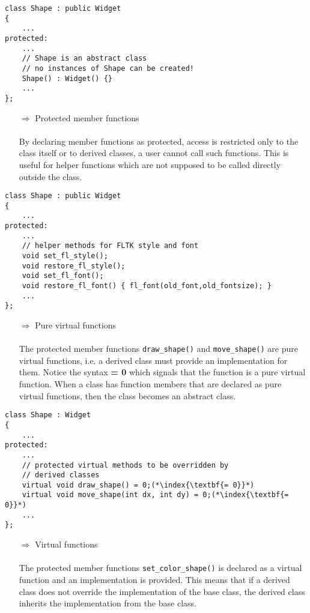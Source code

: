 \documentclass[10pt]{article}
\begin{document}
\begin{lstlisting}
class Shape : public Widget
{
    ...
protected:
    ...
    // Shape is an abstract class
    // no instances of Shape can be created!
    Shape() : Widget() {}
    ...
};
\end{lstlisting}
\begin{enumerate}
\item[$\Rightarrow$] Protected member functions\\ \\ By declaring member functions as protected, access is restricted only to the class itself or to derived classes, a user cannot call such functions. This is useful for helper functions which are not supposed to be called directly outside the class.
\end{enumerate}
\begin{lstlisting}
class Shape : public Widget
{
    ...
protected:
    ...
    // helper methods for FLTK style and font
    void set_fl_style();
    void restore_fl_style();
    void set_fl_font();
    void restore_fl_font() { fl_font(old_font,old_fontsize); }
    ...
};
\end{lstlisting}
\begin{enumerate}
\item[$\Rightarrow$] Pure virtual functions\\ \\ The protected member functions \texttt{draw\_shape()} and \texttt{move\_shape()} are pure virtual functions, i.e. a derived class must provide an implementation for them. Notice the syntax  \textbf{= 0} which signals that the function is a pure virtual function. When a class has function members that are declared as pure virtual functions, then the class becomes an abstract class.
\end{enumerate}
\begin{lstlisting}
class Shape : Widget
{
    ...
protected:
    ...
    // protected virtual methods to be overridden by 
    // derived classes
    virtual void draw_shape() = 0;(*\index{\textbf{= 0}}*)
    virtual void move_shape(int dx, int dy) = 0;(*\index{\textbf{= 0}}*)
    ...
};
\end{lstlisting}
\begin{enumerate}
\item[$\Rightarrow$] Virtual functions\\ \\ The protected member functions \texttt{set\_color\_shape()} is declared as a virtual function and an implementation is provided. This means that if a derived class does not override the implementation of the base class, the derived class inherits the implementation from the base class.
\end{enumerate}
\end{document}

